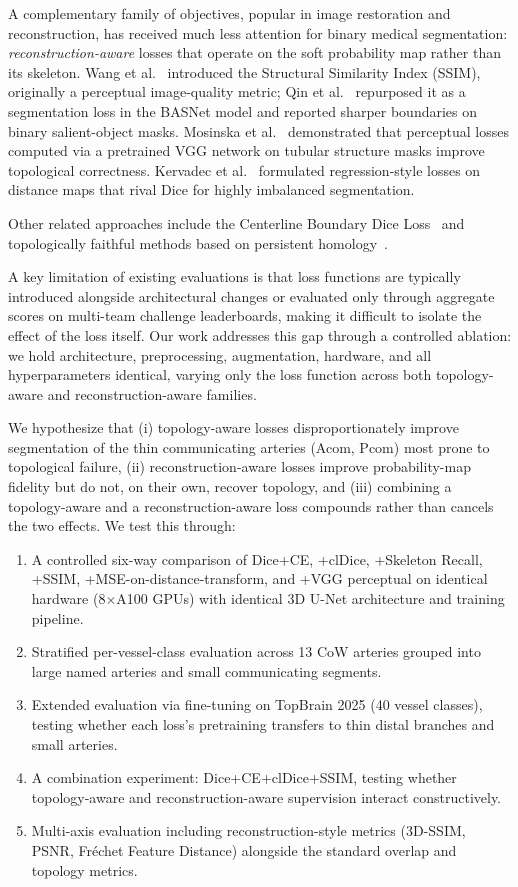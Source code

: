 \documentclass[conference]{IEEEtran}
\begin{document}
A complementary family of objectives, popular in image restoration and reconstruction, has received much less attention for binary medical segmentation: \emph{reconstruction-aware} losses that operate on the soft probability map rather than its skeleton. Wang et al.~\cite{wang2004ssim} introduced the Structural Similarity Index (SSIM), originally a perceptual image-quality metric; Qin et al.~\cite{qin2019basnet} repurposed it as a segmentation loss in the BASNet model and reported sharper boundaries on binary salient-object masks. Mosinska et al.~\cite{mosinska2018} demonstrated that perceptual losses computed via a pretrained VGG network on tubular structure masks improve topological correctness. Kervadec et al.~\cite{kervadec2021boundary} formulated regression-style losses on distance maps that rival Dice for highly imbalanced segmentation.

Other related approaches include the Centerline Boundary Dice Loss~\cite{shi2024cbd} and topologically faithful methods based on persistent homology~\cite{berger2024}.

A key limitation of existing evaluations is that loss functions are typically introduced alongside architectural changes or evaluated only through aggregate scores on multi-team challenge leaderboards, making it difficult to isolate the effect of the loss itself. Our work addresses this gap through a controlled ablation: we hold architecture, preprocessing, augmentation, hardware, and all hyperparameters identical, varying only the loss function across both topology-aware and reconstruction-aware families.

We hypothesize that (i) topology-aware losses disproportionately improve segmentation of the thin communicating arteries (Acom, Pcom) most prone to topological failure, (ii) reconstruction-aware losses improve probability-map fidelity but do not, on their own, recover topology, and (iii) combining a topology-aware and a reconstruction-aware loss compounds rather than cancels the two effects. We test this through:
\begin{enumerate}
    \item A controlled six-way comparison of Dice+CE, +clDice, +Skeleton Recall, +SSIM, +MSE-on-distance-transform, and +VGG perceptual on identical hardware (8$\times$A100 GPUs) with identical 3D U-Net architecture and training pipeline.
    \item Stratified per-vessel-class evaluation across 13 CoW arteries grouped into large named arteries and small communicating segments.
    \item Extended evaluation via fine-tuning on TopBrain 2025 (40 vessel classes), testing whether each loss's pretraining transfers to thin distal branches and small arteries.
    \item A combination experiment: Dice+CE+clDice+SSIM, testing whether topology-aware and reconstruction-aware supervision interact constructively.
    \item Multi-axis evaluation including reconstruction-style metrics (3D-SSIM, PSNR, Fr\'{e}chet Feature Distance) alongside the standard overlap and topology metrics.
\end{enumerate}
\end{document}
